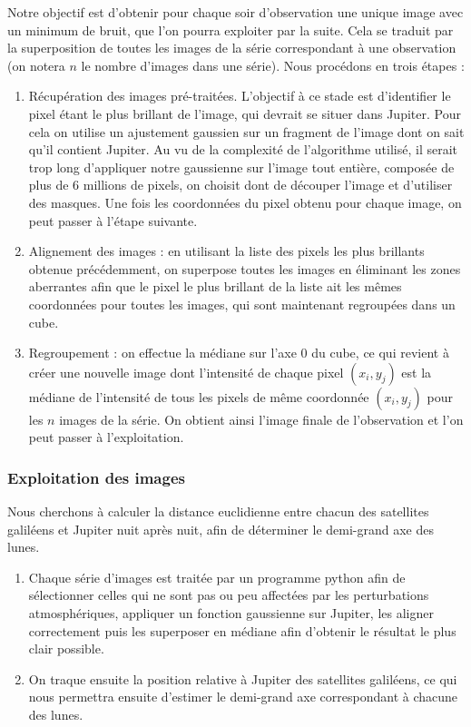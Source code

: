 \documentclass{aa}
\begin{document}
Notre objectif est d'obtenir pour chaque soir d'observation une unique image avec un minimum de bruit, que l'on pourra exploiter par la suite. Cela se traduit par la superposition de toutes les images de la série correspondant à une observation (on notera $n$ le nombre d'images dans une série). Nous procédons en trois étapes : \\
\begin{enumerate}

    \item Récupération des images pré-traitées. L'objectif à ce stade est d'identifier le pixel étant le plus brillant de l'image, qui devrait se situer dans Jupiter. Pour cela on utilise un ajustement gaussien sur un fragment de l'image dont on sait qu'il contient Jupiter. Au vu de la complexité de l'algorithme utilisé, il serait trop long d'appliquer notre gaussienne sur l'image tout entière, composée de plus de 6 millions de pixels, on choisit dont de découper l'image et d'utiliser des masques. Une fois les coordonnées du pixel obtenu pour chaque image, on peut passer à l'étape suivante. \\
    \item Alignement des images : en utilisant la liste des pixels les plus brillants obtenue précédemment, on superpose toutes les images en éliminant les zones aberrantes afin que le pixel le plus brillant de la liste ait les mêmes coordonnées pour toutes les images, qui sont maintenant regroupées dans un cube. \\
    \item Regroupement : on effectue la médiane sur l'axe 0 du cube, ce qui revient à créer une nouvelle image dont l'intensité de chaque pixel $(x_i, y_j)$ est la médiane de l'intensité de tous les pixels de même coordonnée $(x_i,y_j)$ pour les $n$ images de la série. On obtient ainsi l'image finale de l'observation et l'on peut passer à l'exploitation. 

\end{enumerate}

\subsubsection{Exploitation des images}
Nous cherchons à calculer la distance euclidienne entre chacun des satellites galiléens et Jupiter nuit après nuit, afin de déterminer le demi-grand axe des lunes.

\begin{enumerate}
    \item Chaque série d’images est traitée par un programme python afin de sélectionner celles qui ne sont pas ou peu affectées par les perturbations atmosphériques, appliquer un fonction gaussienne sur Jupiter, les aligner correctement puis les superposer en médiane afin d’obtenir le résultat le plus clair possible.
    \item On traque ensuite la position relative à Jupiter des satellites galiléens, ce qui nous permettra ensuite d'estimer le demi-grand axe correspondant à chacune des lunes. 
\end{enumerate}
\end{document}
